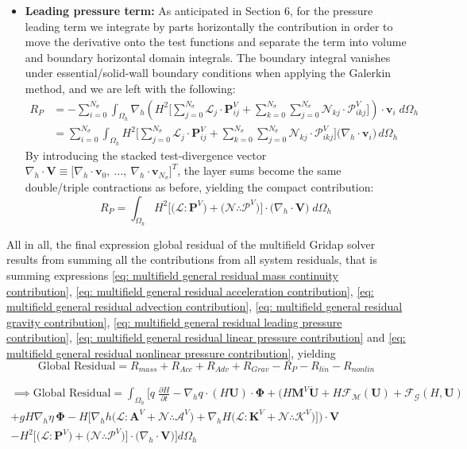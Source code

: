 \documentclass{article}
\newcommand{\Ns}{N_\sigma}
\newcommand{\sumj}{\sum_{j=0}^{\Ns}}
\newcommand{\sumk}{\sum_{k=0}^{\Ns}}
\newcommand{\nablah}{\nabla_h}
\newcommand{\ddt}[1]{\frac{\partial #1}{\partial t}}
\newcommand{\VmM}{\mathbf{M}^V}
\newcommand{\VmA}{\mathbf{A}^V}
\newcommand{\VmK}{\mathbf{K}^V}
\newcommand{\VtA}{\boldsymbol{\mathcal{A}}^V}
\newcommand{\VtK}{\boldsymbol{\mathcal{K}}^V}
\newcommand{\VPij}{\mathbf{P}_{ij}^V}
\newcommand{\VPikj}{\boldsymbol{\mathcal{P}}_{ikj}^V}
\newcommand{\VmP}{\mathbf{P}^V}
\newcommand{\VtP}{\boldsymbol{\mathcal{P}}^V}
\newcommand{\vi}{\mathbf{v}_i}
\newcommand{\Oh}{\Omega_h}
\newcommand{\sumi}{\sum_{i=0}^{\Ns}}
\newcommand{\FMU}{\boldsymbol{\mathcal{F}}_{\mathcal{M}}(\mathbf{U})}
\newcommand{\FGHU}{\boldsymbol{\mathcal{F}}_{\mathcal{G}}(H,\mathbf{U})}
\newcommand{\VL}{\boldsymbol{\mathcal{L}}}
\newcommand{\VN}{\boldsymbol{\mathcal{N}}}
\begin{document}
\begin{itemize}
    \item \textbf{Leading pressure term:} As anticipated in Section 6, for the pressure leading term we integrate by parts horizontally the contribution in order to move the derivative onto the test functions and separate the term into volume and boundary horizontal domain integrals.
    The boundary integral vanishes under essential/solid-wall boundary conditions when applying the Galerkin method, and we are left with the following:
    \begin{align*}
        R_{P} &= -\sumi \int_{\Oh} \nablah\left( H^2 \Big[\sumj \mathcal{L}_j\cdot\VPij + \sumk\sumj \mathcal{N}_{kj}\cdot\VPikj\Big]\right)\cdot\vi\; d\Oh \\
        &= \sumi \int_{\Oh} H^2 \Big[\sumj \mathcal{L}_j\cdot\VPij + \sumk\sumj \mathcal{N}_{kj}\cdot\VPikj\Big] \big(\nablah\cdot\vi\big)\, d\Oh
    \end{align*}
    By introducing the stacked test-divergence vector $\nablah\cdot\mathbf{V} \equiv \big[\nablah\cdot\mathbf{v}_0,\ \dots,\ \nablah\cdot\mathbf{v}_{\Ns}\big]^T$, the layer sums become the same double/triple contractions as before, yielding the compact contribution:
    \begin{equation}
        R_{P} = \int_{\Oh} H^2 \Big[ \big(\VL : \VmP\big) + \big(\VN \therefore \VtP\big) \Big] \cdot \big(\nablah\cdot\mathbf{V}\big) \; d\Oh
        \label{eq: multifield general residual leading pressure contribution}
    \end{equation}
\end{itemize}

All in all, the final expression global residual of the multifield Gridap solver results from summing all the contributions from all system residuals, that is summing expressions \eqref{eq: multifield general residual mass continuity contribution}, \eqref{eq: multifield general residual acceleration contribution}, \eqref{eq: multifield general residual advection contribution}, \eqref{eq: multifield general residual gravity contribution}, \eqref{eq: multifield general residual leading pressure contribution}, \eqref{eq: multifield general residual linear pressure contribution} and \eqref{eq: multifield general residual nonlinear pressure contribution}, yielding
$$\text{Global Residual} = R_{mass} + R_{Acc} + R_{Adv} + R_{Grav} - R_{P} - R_{lin} - R_{nonlin}$$
\begin{framed}
    \begin{multline}
        \implies \text{Global Residual} = \int_{\Oh} \Bigg[ q \;\ddt{H}  - \nablah q\cdot (H\mathbf{U}) \cdot \boldsymbol{\Phi} + \bigg( H \VmM \dot{\mathbf{U}} + H \FMU + \FGHU \\[1mm]
        + g H \nablah \eta\, \boldsymbol{\Phi}  - H\bigg[\nablah h \Big(\VL : \VmA + \VN\therefore \VtA \Big) + \nablah H \Big(\VL : \VmK + \VN\therefore\VtK \Big) \bigg] \bigg) \cdot \mathbf{V} \\[1mm]
        - H^2 \Big[ \big(\VL : \VmP\big) + \big(\VN \therefore \VtP\big) \Big] \cdot \big(\nablah\cdot\mathbf{V}\big) \Bigg] d\Oh
        \label{eq: multifield general residual}
    \end{multline}
\end{framed}
\end{document}

